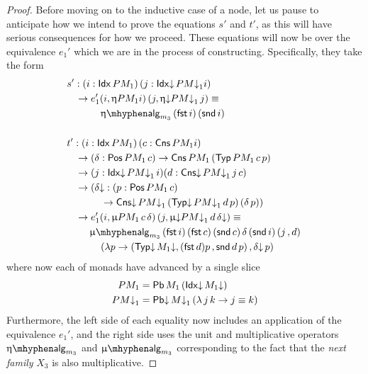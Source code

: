 \begin{proof}
  Before moving on to the inductive case of a node, let us pause to
  anticipate how we intend to prove the equations $s'$ and $t'$, as
  this will have serious consequences for how we proceed.  These
  equations will now be over the equivalence $e_1'$ which we are in
  the process of constructing.  Specifically, they take the form
  \begin{align*}
    &s' : (i : \Idx PM_1)\, (j : \Idxd PM\da_1 i) \\
    &\hspace{.3cm} \to e_1' (i , \upeta PM_1 i)\, (j , \upetad PM\da_1\, j) \equiv \\
    &\hspace{1.2cm} \upeta\alg_{m_3}\, (\fst i)\, (\snd i) \\
    \\
    &t' : (i : \Idx PM_1)\, (c : \Cns PM_1 i) \\
    &\hspace{.3cm} \to (\delta : \Pos PM_1\, c) \to \Cns PM_1\, (\Typ PM_1\, c\, p) \\
    &\hspace{.3cm} \to (j : \Idxd PM\da_1\, i) (d : \Cnsd PM\da_1\, j\, c) \\
    &\hspace{.3cm} \to (\delta\da : (p : \Pos PM_1\, c)\\
    &\hspace{1.2cm} \to \Cnsd PM\da_1\, (\Typd PM\da_1\, d\, p)\, (\delta\, p)) \\
    &\hspace{.3cm} \to e_1' (i , \upmu PM_1\, c\, \delta)\, (j , \upmud PM\da_1\, d\, \delta\da) \equiv \\
    &\hspace{.8cm} \upmu\alg_{m_3}\, (\fst i)\, (\fst c)\, (\snd c)\, \delta\, (\snd i)\, (j \,, d)\, \\
    &\hspace{1.2cm} (\lambda p \to (\Typd M_1\da, (\fst d) p \,, \snd d\, p)\,, \delta\da\, p)
  \end{align*}
  where now each of monads have advanced by a single slice
  \begin{align*}
    PM_1 &= \mathsf{Pb}\, M_1\, (\mathsf{Idx}{\downarrow}\, M_1{\downarrow}) \\
    PM{\downarrow}_1 &= \mathsf{Pb{\downarrow}}\, M{\downarrow}_1\, (\lambda\, j\, k \to j \equiv k)
  \end{align*}
  Furthermore, the left side of each equality now includes an
  application of the equivalence $e_1'$, and the right side uses the
  unit and multiplicative operators $\upeta\alg_{m_3}$ and
  $\upmu\alg_{m_3}$ corresponding to the fact that the \emph{next
    family} $X_3$ is also multiplicative.


\end{proof}
